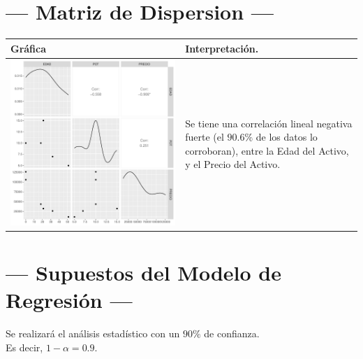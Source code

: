 \documentclass{article}
\begin{document}
\section{\centering --- Matriz de Dispersion ---} %
\begin{center}
  \begin{tabular}{|p{11cm}|p{5cm}|}
    \hline
    Gráfica & Interpretación. \\ \hline 
    \begin{minipage}{\textwidth}
    \includegraphics[width= 0.5 \linewidth, page=1]{r/Rplots.pdf}
    \end{minipage} 
    &
		Se tiene una correlación lineal negativa fuerte (el \(90.6\%\) de los datos lo corroboran),
		entre la Edad del Activo, y el Precio del Activo.
		\\ \hline 
  \end{tabular}
\end{center} 

\newpage

\section{\centering --- Supuestos del Modelo de Regresión ---} %

Se realizará el análisis estadístico con un \(90\%\) de confianza. \\ 
Es decir, \(1- \alpha = 0.9\).
\end{document}
